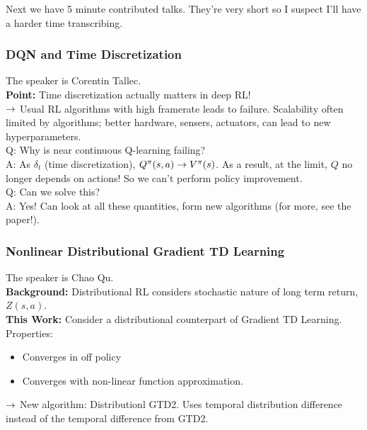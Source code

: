 Next we have 5 minute contributed talks. They're very short so I suspect I'll have a harder time transcribing.

\subsubsection{DQN and Time Discretization}

The speaker is Corentin Tallec. \\

{\bf Point:} Time discretization actually matters in deep RL! \\

$\rightarrow$ Usual RL algorithms with high framerate leads to failure. Scalability often limited by algorithms; better hardware, sensers, actuators, can lead to new hyperparameters. \\

Q: Why is near continuous Q-learning failing? \\

A: As $\delta_t$ (time discretization), $Q^\pi(s,a) \rightarrow V^\pi(s)$. As a result, at the limit, $Q$ no longer depends on actions! So we can't perform policy improvement. \\

Q: Can we solve this? \\

A: Yes! Can look at all these quantities, form new algorithms (for more, see the paper!). 

\spacerule

\subsubsection{Nonlinear Distributional Gradient TD Learning}

The speaker is Chao Qu. \\
 
{\bf Background:} Distributional RL considers stochastic nature of long term return, $Z(s,a)$. \\

{\bf This Work:} Consider a distributional counterpart of Gradient TD Learning. Properties:
\begin{itemize}
    \item Converges in off policy
    \item Converges with non-linear function approximation.
\end{itemize}

$\rightarrow$ New algorithm: Distributionl GTD2. Uses temporal distribution difference instead of the temporal difference from GTD2. 


